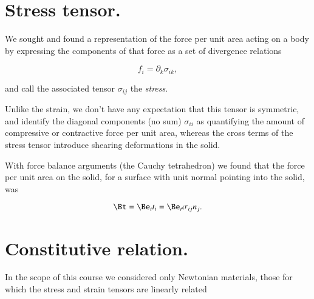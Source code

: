 % 
% 
% 
% 
% 
% 
% 
% 
% 
% 
% 
% 
\section{Stress tensor.}

We sought and found a representation of the force per unit area acting on a body by expressing the components of that force as a set of divergence relations

\begin{equation}\label{eqn:continuumElasticityReview:250}
f_i = \partial_k \sigma_{i k},
\end{equation}

and call the associated tensor $\sigma_{ij}$ the \textit{stress}.

Unlike the strain, we don't have any expectation that this tensor is symmetric, and identify the diagonal components (no sum) $\sigma_{i i}$ as quantifying the amount of compressive or contractive force per unit area, whereas the cross terms of the stress tensor introduce shearing deformations in the solid.

With force balance arguments (the Cauchy tetrahedron) we found that the force per unit area on the solid, for a surface with unit normal pointing into the solid, was

\begin{equation}\label{eqn:continuumElasticityReview:270}
\Bt = \Be_i t_i = \Be_i \sigma_{ij} n_j.
\end{equation}

\section{Constitutive relation.}

In the scope of this course we considered only Newtonian materials, those for which the stress and strain tensors are linearly related

